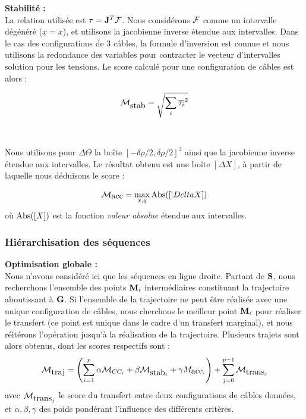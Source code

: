 {\bf Stabilit\'e :}\\

La relation utilis\'ee est ${\bf \tau} = {\bf J}^{T} {\boldmath \mathcal F}$. 
Nous consid\'erons ${\boldmath \mathcal F}$ comme un intervalle 
d\'eg\'en\'er\'e ($\underline{x} = \overline{x}$), et utilisons la jacobienne 
inverse \'etendue aux intervalles. Dans le cas des configurations de $3$ 
c\^ables, la formule d'inversion est connue et nous utilisons la redondance des 
variables pour contracter le vecteur d'intervalles solution pour les tensions. 
Le score calcul\'e pour une configuration de c\^ables est alors :

\begin{equation}
\mathcal M_{\hbox{stab}} = \sqrt{\sum_i \overline{\tau_i}^2}
\label{chap03:eq20}
\end{equation}\\

\\

Nous utilisons pour $\Delta \Theta$ la bo\^ite $[-\delta \rho/2, \delta 
\rho/2]^3$ ainsi que la jacobienne inverse \'etendue aux intervalles. Le 
r\'esultat obtenu est une bo\^ite $[\Delta X]$, \`a partir de laquelle nous 
d\'eduisons le score :

\begin{equation}
\mathcal M_{\hbox{acc}} = \max_{x,y}{\hbox{Abs}([|Delta X])}
\label{chap03:eq21}
\end{equation}
o\`u $\hbox{Abs}([X])$ est la fonction {\it valeur absolue} \'etendue aux 
intervalles.

\subsubsection{Hi\'erarchisation des s\'equences}

{\bf Optimisation globale :}\\

Nous n'avons consid\'er\'e ici que les s\'equences en ligne droite. Partant de 
${\bf S}$, nous recherchons l'ensemble des points ${\bf M}_i$ interm\'ediaires 
constituant la trajectoire aboutissant \`a $\bf G$. Si l'ensemble de la 
trajectoire ne peut \^etre r\'ealis\'ee avec une unique configuration de 
c\^ables, nous cherchons le meilleur point ${\bf M}_i$ pour r\'ealiser le 
transfert (ce point est unique dans le cadre d'un transfert marginal), et nous 
r\'eit\'erons l'op\'eration jusqu'\`a la r\'ealisation de la trajectoire. 
Plusieurs trajets sont alors obtenus, dont les scores respectifs sont :
\begin{equation}
\mathcal M_{\hbox{traj}} = \left (\sum_{i=1}^p \alpha \mathcal M_{CC_i} + \beta 
\mathcal M_{\hbox{stab}_i} + \gamma M_{\hbox{acc}_i} \right ) + \sum_{j = 
0}^{p-1} \mathcal M_{\hbox{trans}_j} 
\label{chap03:eq22}
\end{equation}
avec $\mathcal M_{\hbox{trans}_j}$ le score du transfert entre deux 
configurations de c\^ables donn\'ees, et $\alpha, \beta, \gamma$ des poids 
pond\'erant l'influence des diff\'erents crit\`eres.\\

